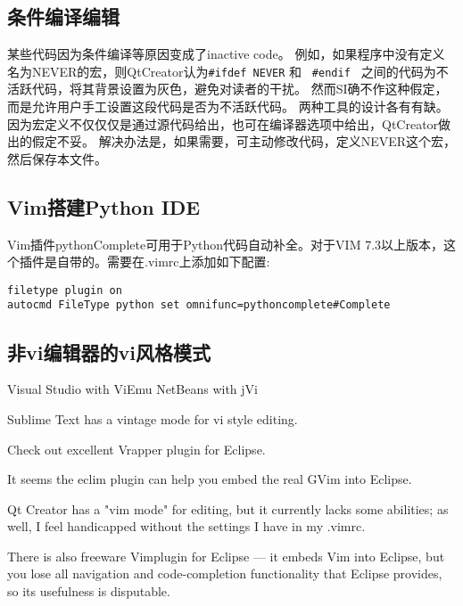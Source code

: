 \subsection{条件编译编辑}
某些代码因为条件编译等原因变成了inactive code。
例如，如果程序中没有定义名为NEVER的宏，则QtCreator认为\verb$#ifdef NEVER$ 和 \verb$ #endif $ 之间的代码为不活跃代码，将其背景设置为灰色，避免对读者的干扰。
然而SI确不作这种假定，而是允许用户手工设置这段代码是否为不活跃代码。
两种工具的设计各有有缺。
因为宏定义不仅仅仅是通过源代码给出，也可在编译器选项中给出，QtCreator做出的假定不妥。
解决办法是，如果需要，可主动修改代码，定义NEVER这个宏，然后保存本文件。




\subsection{Vim搭建Python IDE}
Vim插件pythonComplete可用于Python代码自动补全。对于VIM 7.3以上版本，这个插件是自带的。需要在.vimrc上添加如下配置:
\begin{verbatim}
filetype plugin on
autocmd FileType python set omnifunc=pythoncomplete#Complete
\end{verbatim}

\subsection{非vi编辑器的vi风格模式}

Visual Studio with ViEmu
NetBeans with jVi

Sublime Text has a vintage mode for vi style editing.

Check out excellent Vrapper plugin for Eclipse.

It seems the eclim plugin can help you embed the real GVim into Eclipse.

Qt Creator has a "vim mode" for editing, but it currently lacks some abilities; as well, I feel handicapped without the settings I have in my .vimrc.

There is also freeware Vimplugin for Eclipse — it embeds Vim into Eclipse, but you lose all navigation and code-completion functionality that Eclipse provides, so its usefulness is disputable.




















